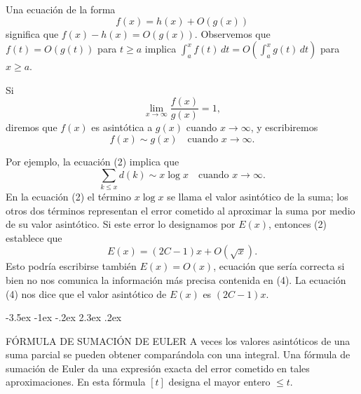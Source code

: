 \documentclass[12pt,a4paper]{book}
\makeatletter
\renewcommand\section{\@startsection{section}{1}{\z@}%
  {-3.5ex \@plus -1ex \@minus -.2ex}%
  {2.3ex \@plus .2ex}%
  {\normalfont\Large\bfseries\raggedright}}
\makeatother
\begin{document}
    Una ecuación de la forma
    \begin{equation*}
        f(x)=h(x)+O(g(x))
    \end{equation*}
    significa que $f(x)-h(x)=O(g(x))$. Observemos que $f(t)=O(g(t))$ para $t\geq a$ implica
    $\int_{a}^{x} f(t)\,dt=O\left(\int_{a}^{x} g(t)\,dt\right)$ para $x\geq a$.

    \begin{definicion}
        Si
        \begin{equation*}
            \lim_{x\to\infty}\frac{f(x)}{g(x)}=1,
        \end{equation*}
        diremos que $f(x)$ es asintótica a $g(x)$ cuando $x\to\infty$, y escribiremos
        \begin{equation*}
            f(x)\sim g(x)\quad\text{cuando } x\to\infty.
        \end{equation*}
    \end{definicion}

    Por ejemplo, la ecuación (2) implica que
    \begin{equation*}
        \sum_{k\leq x}d(k)\sim x\log x\quad\text{cuando } x\to\infty.
    \end{equation*}
    En la ecuación (2) el término $x\log x$ se llama el valor asintótico de la suma; los
    otros dos términos representan el error cometido al aproximar la suma por medio de su
    valor asintótico. Si este error lo designamos por $E(x)$, entonces (2) establece que
    \begin{equation}
        E(x)=(2C-1)x+O(\sqrt{x}).
    \end{equation}
    Esto podría escribirse también $E(x)=O(x)$, ecuación que sería correcta si bien no nos
    comunica la información más precisa contenida en (4). La ecuación (4) nos dice que el
    valor asintótico de $E(x)$ es $(2C-1)x$.

    \section{FÓRMULA DE SUMACIÓN DE EULER}
    A veces los valores asintóticos de una suma parcial se pueden obtener comparándola con
    una integral. Una fórmula de sumación de Euler da una expresión exacta del error
    cometido en tales aproximaciones. En esta fórmula $[t]$ designa el mayor entero
    $\leq t$.
\end{document}
